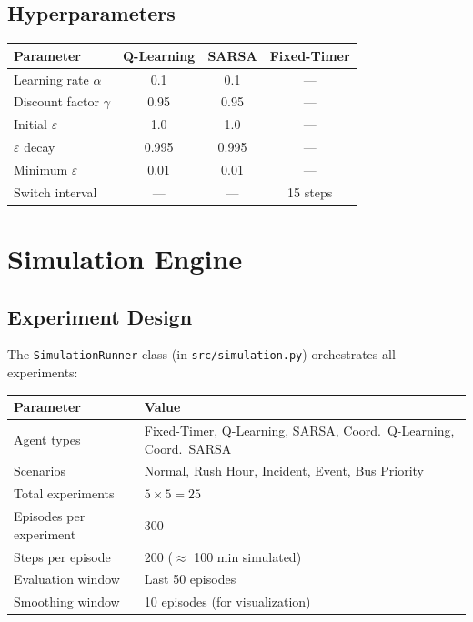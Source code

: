 \documentclass[12pt, a4paper]{article}
\begin{document}
\subsection{Hyperparameters}

\begin{center}
\begin{tabular}{lccc}
    \toprule
    \textbf{Parameter} & \textbf{Q-Learning} & \textbf{SARSA} & \textbf{Fixed-Timer} \\
    \midrule
    Learning rate $\alpha$ & 0.1 & 0.1 & --- \\
    Discount factor $\gamma$ & 0.95 & 0.95 & --- \\
    Initial $\varepsilon$ & 1.0 & 1.0 & --- \\
    $\varepsilon$ decay & 0.995 & 0.995 & --- \\
    Minimum $\varepsilon$ & 0.01 & 0.01 & --- \\
    Switch interval & --- & --- & 15 steps \\
    \bottomrule
\end{tabular}
\end{center}

\section{Simulation Engine}

\subsection{Experiment Design}

The \texttt{SimulationRunner} class (in \texttt{src/simulation.py}) orchestrates all experiments:

\begin{center}
\begin{tabular}{ll}
    \toprule
    \textbf{Parameter} & \textbf{Value} \\
    \midrule
    Agent types & Fixed-Timer, Q-Learning, SARSA, Coord.\ Q-Learning, Coord.\ SARSA \\
    Scenarios & Normal, Rush Hour, Incident, Event, Bus Priority \\
    Total experiments & $5 \times 5 = 25$ \\
    Episodes per experiment & 300 \\
    Steps per episode & 200 ($\approx$ 100 min simulated) \\
    Evaluation window & Last 50 episodes \\
    Smoothing window & 10 episodes (for visualization) \\
    \bottomrule
\end{tabular}
\end{center}
\end{document}

